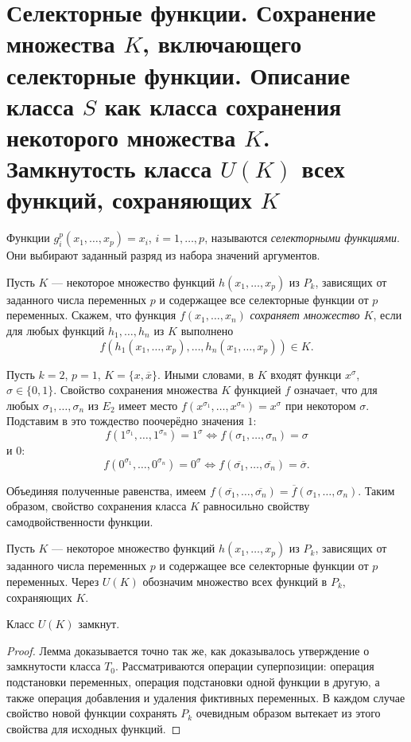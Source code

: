 \section{Селекторные функции. Сохранение множества $K$, включающего селекторные функции. Описание класса $S$ как класса сохранения некоторого множества $K$. Замкнутость класса $U(K)$ всех функций, сохраняющих $K$}

\begin{definition}
    Функции $g_i^p(x_1, \ldots, x_p) = x_i$, $i = 1, \ldots, p$, называются \textit{селекторными функциями}. Они выбирают заданный разряд из набора значений аргументов.
\end{definition}

\begin{definition}
    Пусть $K$ --- некоторое множество функций $h(x_1, \ldots, x_p)$ из $P_k$, зависящих от заданного числа переменных $p$ и содержащее все селекторные функции от $p$ переменных. Скажем, что функция $f(x_1, \ldots, x_n)$ \textit{сохраняет множество $K$}, если для любых функций $h_1, \ldots, h_n$ из $K$ выполнено
    \[
        f(h_1(x_1, \ldots, x_p), \ldots, h_n(x_1, \ldots, x_p)) \in K.
    \]
\end{definition}

\begin{example}
    Пусть $k = 2$, $p = 1$, $K = \{x, \overline{x}\}$. Иными словами, в $K$ входят функци $x^\sigma$, $\sigma \in \{0, 1\}$. Свойство сохранения множества $K$ функцией $f$ означает, что для любых $\sigma_1, \ldots, \sigma_n$ из $E_2$ имеет место $f(x^{\sigma_1}, \ldots, x^{\sigma_n}) = x^\sigma$ при некотором $\sigma$. Подставим в это тождество поочерёдно значения $1$:
    \[
        f(1^{\sigma_1}, \ldots, 1^{\sigma_n}) = 1^\sigma \Leftrightarrow f(\sigma_1, \ldots, \sigma_n) = \sigma
    \]
    и $0$:
    \[
        f(0^{\sigma_1}, \ldots, 0^{\sigma_n}) = 0^\sigma \Leftrightarrow f(\overline{\sigma_1}, \ldots, \overline{\sigma_n}) = \overline{\sigma}.
    \]

    Объединяя полученные равенства, имеем $f(\overline{\sigma_1}, \ldots, \overline{\sigma_n}) = \overline{f}(\sigma_1, \ldots, \sigma_n)$. Таким образом, свойство сохранения класса $K$ равносильно свойству самодвойственности функции.
\end{example}

Пусть $K$ --- некоторое множество функций $h(x_1, \ldots, x_p)$ из $P_k$, зависящих от заданного числа переменных $p$ и содержащее все селекторные функции от $p$ переменных. Через $U(K)$ обозначим множество всех функций в $P_k$, сохраняющих $K$.

\begin{lemma}
    Класс $U(K)$ замкнут.
\end{lemma}

\begin{proof}
    Лемма доказывается точно так же, как доказывалось утверждение о замкнутости класса $T_0$. Рассматриваются операции суперпозиции: операция подстановки переменных, операция подстановки одной функции в другую, а также операция добавления и удаления фиктивных переменных. В каждом случае свойство новой функции сохранять $P_k$ очевидным образом вытекает из этого свойства для исходных функций.
\end{proof}

